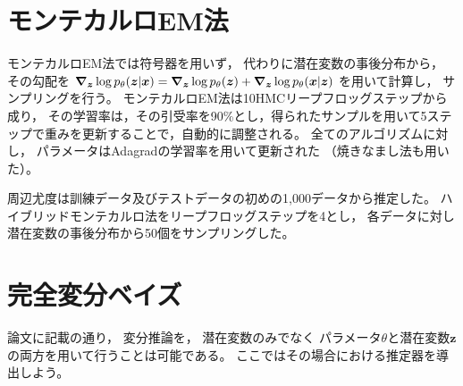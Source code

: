 \documentclass[dvipdfmx, fleqn, draft]{jsarticle}
\begin{document}
\section{モンテカルロEM法}

モンテカルロEM法では符号器を用いず，
代わりに潜在変数の事後分布から，
その勾配を
\(\grad_{\bm{z}} \log{p_{\theta} (\bm{z} | \bm{x})} = \grad_{\bm{z}} \log{p_{\theta} (\bm{z})} + \grad_{\bm{z}} \log{p_{\theta} (\bm{x} | \bm{z})}\)
を用いて計算し，
サンプリングを行う。
モンテカルロEM法は10HMCリープフロッグステップから成り，
その学習率は，その引受率を90{\%}とし，得られたサンプルを用いて5ステップで重みを更新することで，自動的に調整される。
全てのアルゴリズムに対し，
パラメータはAdagradの学習率を用いて更新された
（焼きなまし法も用いた）。

周辺尤度は訓練データ及びテストデータの初めの1,000データから推定した。
ハイブリッドモンテカルロ法をリープフロッグステップを4とし，
各データに対し潜在変数の事後分布から50個をサンプリングした。



\section{完全変分ベイズ}

論文に記載の通り，
変分推論を，
潜在変数のみでなく
パラメータ\(\theta\)と潜在変数\(\bm{z}\)の両方を用いて行うことは可能である。
ここではその場合における推定器を導出しよう。
\end{document}
